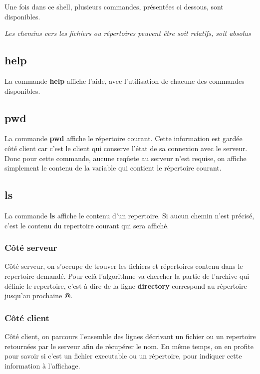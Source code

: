 \documentclass[titlepage]{article}
\begin{document}
	Une fois dans ce shell, plusieurs commandes, présentées ci dessous, sont disponibles.

	\textit{Les chemins vers les fichiers ou répertoires peuvent être soit relatifs, soit absolus}

	\subsection{help}

	La commande \textbf{help} affiche l'aide, avec l'utilisation de chacune des commandes disponibles.

	\subsection{pwd}

	La commande \textbf{pwd} affiche le répertoire courant. Cette information est gardée côté client car c'est le client qui conserve l'état de sa connexion avec le serveur. Donc pour cette commande, aucune reqûete au serveur n'est requise, on affiche simplement le contenu de la variable qui contient le répertoire courant.

	\subsection{ls}

	La commande \textbf{ls} affiche le contenu d'un repertoire. Si aucun chemin n'est précisé, c'est le contenu du repertoire courant qui sera affiché.

	\subsubsection{Côté serveur}

	Côté serveur, on s'occupe de trouver les fichiers et répertoires contenu dans le repertoire demandé. Pour celà l'algorithme va chercher la partie de l'archive qui définie le repertoire, c'est à dire de la ligne \textbf{directory} correspond au répertoire jusqu'au prochaine \textbf{@}. 

	\subsubsection{Côté client}

	Côté client, on parcours l'ensemble des lignes décrivant un fichier ou un repertoire retournées par le serveur afin de récupérer le nom. En même temps, on en profite pour savoir si c'est un fichier executable ou un répertoire, pour indiquer cette information à l'affichage.
\end{document}
